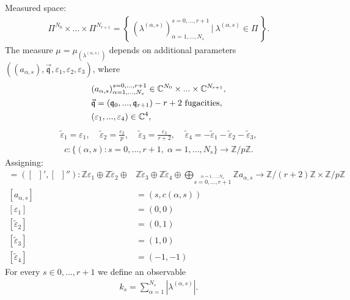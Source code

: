 \documentclass[12pt]{article}
\numberwithin{equation}{section}
\theoremstyle{definition}
\begin{document}
Measured space:
\begin{align*}
    \Pi^{N_0}\times \ldots \times \Pi^{N_{r+1}} = \left\{\, \left( \lambda^{(\alpha, s)} \right)_{\alpha = 1, ..., N_{s}}^{s = 0, ..., r+1}\, \Biggr| \ {\lambda}^{(\alpha, s)} \in \Pi \, \right\}.
\end{align*}
The measure $\mu = \mu_{(\lambda^{(\alpha, s)})}$ depends on additional parameters $((a_{\alpha, s}), \vec{\mathfrak{q}}, \varepsilon_1, \varepsilon_2, \varepsilon_3)$, where
\begin{align*}
    &(a_{\alpha, s})_{\alpha =1, ..., N_{s}}^{s = 0, ..., r+1} \in \mathbb{C}^{N_{0}} \times ... \times \mathbb{C}^{N_{r+1}},\\
    &\vec{\frak{q}} = (\frak{q}_{0}, ..., \frak{q}_{r+1}) - r+2 \text{ fugacities},\\
    &(\varepsilon_1, ..., \varepsilon_{4}) \in \mathbb{C}^{4},
\end{align*}
\begin{align*}
    \tilde{\varepsilon}_1 = \varepsilon_1 , \;\;\;\; \tilde{\varepsilon}_2 = \frac{\varepsilon_2}{p}, \;\;\;\; \tilde{\varepsilon}_3
 = \frac{\varepsilon_3}{r + 2}, \;\;\;\; \tilde{\varepsilon}_4 = - \tilde{\varepsilon}_1 - \tilde{\varepsilon}_2 - \tilde{\varepsilon}_3 ,
 \end{align*}
 \begin{align*}
    c: \{(\alpha, s): s = 0, ..., r+1, \; \alpha = 1, ..., N_s\} \rightarrow \mathbb{Z}/p\mathbb{Z}.
\end{align*}
Assigning:
\begin{align*}
    [\;\;] = ([\;\;]', [\;\;]''):\mathbb{Z}\varepsilon_{1} \oplus \mathbb{Z}\tilde{\varepsilon}_{2}\oplus 
   &\mathbb{Z}\tilde{\varepsilon}_{3} \oplus \mathbb{Z}\tilde{\varepsilon}_{4}\oplus \bigoplus\limits_{\stackrel{\alpha = 1, ..., N_{s}}{s = 0, ..., r+1}} \mathbb{Z}a_{\alpha, s} \rightarrow \mathbb{Z}/(r+2)\mathbb{Z}\times \mathbb{Z}/p\mathbb{Z}\\
    [a_{\alpha, s}] &= (s, c(\alpha, s))\\
   [\varepsilon_{1}] &= (0, 0)\\
      [\tilde{\varepsilon}_{2}] &= (0, 1)\\
         [\tilde{\varepsilon}_{3}] &= (1, 0)\\
            [\tilde{\varepsilon}_{4}] &= (-1, -1)
\end{align*}
For every $s \in {0, ..., r+1}$ we define an observable 
\begin{align*}
    k_s = \sum\limits_{\alpha = 1}^{N_{s}} |\lambda^{(\alpha, s)}|.
\end{align*}
\end{document}

